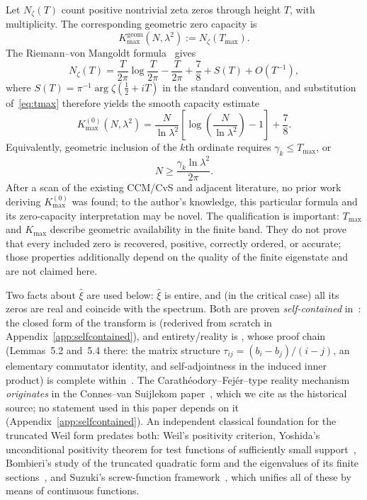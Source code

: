 \documentclass[11pt,a4paper]{article}
\begin{document}
Let $N_\zeta(T)$ count positive nontrivial zeta zeros through height $T$, with
multiplicity. The corresponding geometric zero capacity is
\begin{equation}\label{eq:kmax-exact}
  K_{\max}^{\mathrm{geom}}(N,\lambda^2):=N_\zeta(T_{\max}).
\end{equation}
The Riemann--von Mangoldt formula~\cite{Titchmarsh1986} gives
\[
  N_\zeta(T)=\frac{T}{2\pi}\log\frac{T}{2\pi}
  -\frac{T}{2\pi}+\frac78+S(T)+O(T^{-1}),
\]
where $S(T)=\pi^{-1}\arg\zeta(\tfrac12+iT)$ in the standard convention,
and substitution of~\eqref{eq:tmax} therefore yields the smooth capacity
estimate
\begin{equation}\label{eq:kmax}
  \boxed{\;K_{\max}^{(0)}(N,\lambda^2)
  =\frac{N}{\ln\lambda^2}
   \left[\log\!\left(\frac{N}{\ln\lambda^2}\right)-1\right]+\frac78.\;}
\end{equation}
Equivalently, geometric inclusion of the $k$th ordinate requires
$\gamma_k\le T_{\max}$, or
\begin{equation}\label{eq:k-reach-condition}
  N\ge\frac{\gamma_k\ln\lambda^2}{2\pi}.
\end{equation}
After a scan of the existing CCM/CvS and adjacent literature, no prior work
deriving $K_{\max}^{(0)}$ was found; to the author's knowledge, this particular
formula and its zero-capacity interpretation may be novel. The qualification
is important: $T_{\max}$ and $K_{\max}$ describe geometric availability in the
finite band. They do not prove that every included zero is recovered, positive,
correctly ordered, or accurate; those properties additionally depend on the
quality of the finite eigenstate and are not claimed here.

Two facts about $\widehat\xi$ are used below: $\widehat\xi$ is entire, and (in
the critical case) all its zeros are real and coincide with the spectrum. Both
are proven \emph{self-contained} in~\cite{CCM2025}: the closed form of the
transform is \cite[Prop.~5.9]{CCM2025} (rederived from scratch in
Appendix~\ref{app:selfcontained}), and entirety/reality is
\cite[Thm.~5.10]{CCM2025}, whose proof chain (Lemmas~5.2 and~5.4 there: the
matrix structure $\tau_{ij}=(b_i-b_j)/(i-j)$, an elementary commutator
identity, and self-adjointness in the induced inner product) is complete
within~\cite{CCM2025}. The Carath\'eodory--Fej\'er--type reality mechanism
\emph{originates} in the Connes--van Suijlekom paper~\cite{CvS2025}, which we
cite as the historical source; no statement used in this paper depends on it
(Appendix~\ref{app:selfcontained}). An independent classical foundation for the
truncated Weil form predates both: Weil's positivity criterion, Yoshida's
unconditional positivity theorem for test functions of sufficiently small
support~\cite{Yoshida1992}, Bombieri's study of the truncated quadratic form
and the eigenvalues of its finite sections~\cite{Bombieri2000}, and Suzuki's
screw-function framework~\cite{SuzukiJLMS,SuzukiHilbert,Suzuki2026}, which
unifies all of these by means of continuous functions.
\end{document}
